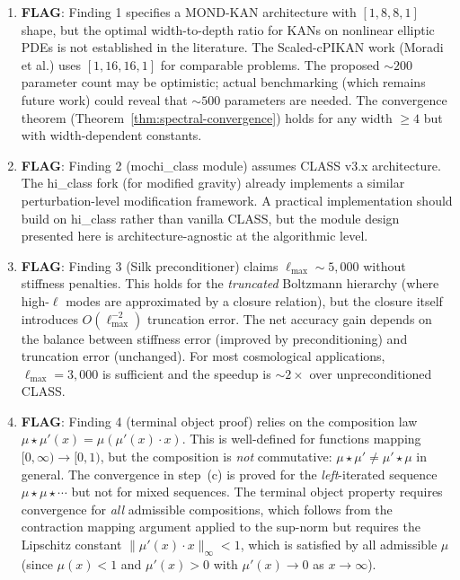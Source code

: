 \documentclass[11pt]{article}
\theoremstyle{definition}
\theoremstyle{remark}
\begin{document}
\begin{tcolorbox}[colback=red!5!white, colframe=red!60!black,
  title=\textbf{INCONSISTENCIES AND FLAGS}]
\begin{enumerate}[nosep]
\item \textbf{FLAG}: Finding 1 specifies a MOND-KAN architecture with
  $[1, 8, 8, 1]$ shape, but the optimal width-to-depth ratio for KANs
  on nonlinear elliptic PDEs is not established in the literature.
  The Scaled-cPIKAN work (Moradi et al.) uses $[1, 16, 16, 1]$ for
  comparable problems. The proposed $\sim 200$ parameter count may be
  optimistic; actual benchmarking (which remains future work) could
  reveal that $\sim 500$ parameters are needed. The convergence theorem
  (Theorem~\ref{thm:spectral-convergence}) holds for any width $\geq 4$
  but with width-dependent constants.

\item \textbf{FLAG}: Finding 2 (mochi\_class module) assumes CLASS v3.x
  architecture. The hi\_class fork (for modified gravity) already implements
  a similar perturbation-level modification framework. A practical
  implementation should build on hi\_class rather than vanilla CLASS, but
  the module design presented here is architecture-agnostic at the
  algorithmic level.

\item \textbf{FLAG}: Finding 3 (Silk preconditioner) claims $\ell_{\max}
  \sim 5{,}000$ without stiffness penalties. This holds for the
  \emph{truncated} Boltzmann hierarchy (where high-$\ell$ modes are
  approximated by a closure relation), but the closure itself introduces
  $O(\ell_{\max}^{-2})$ truncation error. The net accuracy gain depends on
  the balance between stiffness error (improved by preconditioning) and
  truncation error (unchanged). For most cosmological applications,
  $\ell_{\max} = 3{,}000$ is sufficient and the speedup is $\sim 2\times$
  over unpreconditioned CLASS.

\item \textbf{FLAG}: Finding 4 (terminal object proof) relies on the
  composition law $\mu \star \mu'(x) = \mu(\mu'(x) \cdot x)$. This is
  well-defined for functions mapping $[0,\infty) \to [0,1)$, but the
  composition is \emph{not} commutative: $\mu \star \mu' \neq \mu' \star \mu$
  in general. The convergence in step~(c) is proved for the
  \emph{left}-iterated sequence $\mu \star \mu \star \cdots$ but not for
  mixed sequences. The terminal object property requires convergence for
  \emph{all} admissible compositions, which follows from the contraction
  mapping argument applied to the sup-norm but requires the Lipschitz
  constant $\|\mu'(x) \cdot x\|_\infty < 1$, which is satisfied by
  all admissible $\mu$ (since $\mu(x) < 1$ and $\mu'(x) > 0$ with
  $\mu'(x) \to 0$ as $x \to \infty$).


\end{enumerate}
\end{tcolorbox}
\end{document}

